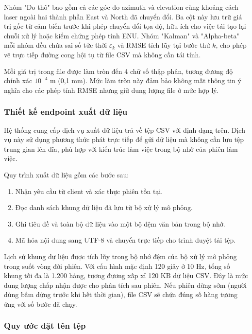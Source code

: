 Nhóm "Đo thô" bao gồm cả các góc đo azimuth và elevation cùng khoảng cách laser ngoài hai thành phần East và North đã chuyển đổi. Ba cột này lưu trữ giá trị gốc từ cảm biến trước khi phép chuyển đổi tọa độ, hữu ích cho việc tái tạo lại chuỗi xử lý hoặc kiểm chứng phép tính ENU. Nhóm "Kalman" và "Alpha-beta" mỗi nhóm đều chứa sai số tức thời $\varepsilon_k$ và RMSE tích lũy tại bước thứ $k$, cho phép vẽ trực tiếp đường cong hội tụ từ file CSV mà không cần tái tính.

Mỗi giá trị trong file được làm tròn đến 4 chữ số thập phân, tương đương độ chính xác $10^{-4}$ m (0,1 mm). Mức làm tròn này đảm bảo không mất thông tin ý nghĩa cho các phép tính RMSE nhưng giữ dung lượng file ở mức hợp lý.

\subsubsection{Thiết kế endpoint xuất dữ liệu}

\hspace{0.5cm} Hệ thống cung cấp dịch vụ xuất dữ liệu trả về tệp CSV với định dạng trên. Dịch vụ này sử dụng phương thức phát trực tiếp để gửi dữ liệu mà không cần lưu tệp trung gian lên đĩa, phù hợp với kiến trúc làm việc trong bộ nhớ của phiên làm việc.

Quy trình xuất dữ liệu gồm các bước sau:
\begin{enumerate}
\item Nhận yêu cầu từ client và xác thực phiên tồn tại.
\item Đọc danh sách khung dữ liệu đã lưu từ bộ xử lý mô phỏng.
\item Ghi tiêu đề và toàn bộ dữ liệu vào một bộ đệm văn bản trong bộ nhớ.
\item Mã hóa nội dung sang UTF-8 và chuyển trực tiếp cho trình duyệt tải tệp.
\end{enumerate}

Lịch sử khung dữ liệu được tích lũy trong bộ nhớ đệm của bộ xử lý mô phỏng trong suốt vòng đời phiên. Với cấu hình mặc định 120 giây ở 10 Hz, tổng số khung tối đa là 1.200 hàng, tương đương xấp xỉ 120 KB dữ liệu CSV. Đây là mức dung lượng chấp nhận được cho phân tích sau phiên. Nếu phiên dừng sớm (người dùng bấm dừng trước khi hết thời gian), file CSV sẽ chứa đúng số hàng tương ứng với số bước đã chạy.

\subsubsection{Quy ước đặt tên tệp}

